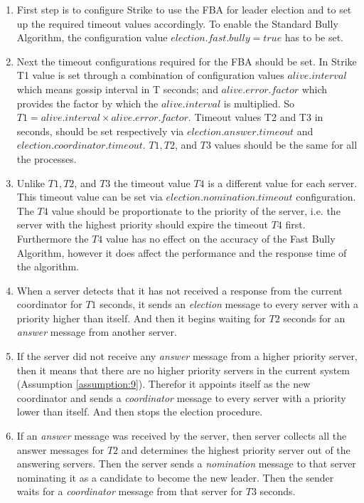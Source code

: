 \documentclass[dareport.tex]{subfiles}
\begin{document}
\begin{enumerate}[leftmargin=*]
	\item First step is to configure Strike to use the FBA for leader election and to set up the required timeout values accordingly. To enable the Standard Bully Algorithm, the configuration value $election.fast.bully=true$ has to be set.
	\item Next the timeout configurations required for the FBA should be set. In Strike T1 value is set through a combination of configuration values $ alive.interval $ which means gossip interval in T seconds; and $ alive.error.factor $ which provides the factor by which the $ alive.interval $ is multiplied. So $ T1= alive.interval \times alive.error.factor $. Timeout values T2 and T3 in seconds, should be set respectively via $ election.answer.timeout $ and $ election.coordinator.timeout $. $T1, T2 $, and $ T3 $ values should be the same for all the processes.
	\item Unlike $ T1, T2 $, and $ T3 $ the timeout value $ T4 $ is a different value for each server. This timeout value can be set via $ election.nomination.timeout $ configuration. The $ T4 $ value should be proportionate to the priority of the server, i.e. the server with the highest priority should expire the timeout $ T4 $ first. Furthermore the $ T4 $ value has no effect on the accuracy of the Fast Bully Algorithm, however it does affect the performance and the response time of the algorithm.
	\item When a server detects that it has not received a response from the current coordinator for $ T1 $ seconds, it sends an \emph{election} message to every server with a priority higher than itself. And then it begins waiting for $ T2 $ seconds for an \emph{answer} message from another server.
	\item If the server did not receive any \emph{answer} message from a higher priority server, then it means that there are no higher priority servers in the current system (Assumption \ref{assumption:9}). Therefor it appoints itself as the new coordinator and sends a \emph{coordinator} message to every server with a priority lower than itself. And then stops the election procedure.
	\item If an \emph{answer} message was received by the server, then server collects all the answer messages for $ T2 $ and determines the highest priority server out of the answering servers. Then the server sends a \emph{nomination} message to that server nominating it as a candidate to become the new leader. Then the sender waits for a \emph{coordinator} message from that server for $ T3 $ seconds.

\end{enumerate}
\end{document}
